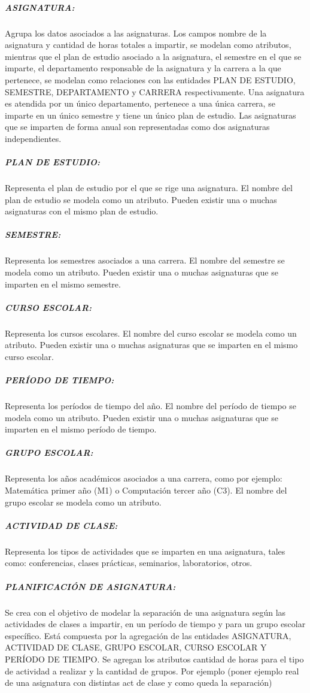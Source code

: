 \subparagraph{ASIGNATURA:}
Agrupa los datos asociados a las asignaturas.
Los campos nombre de la asignatura y cantidad de horas 
totales a impartir, se modelan como atributos, mientras que
el plan de estudio asociado a la asignatura, el semestre en el que se 
imparte, el departamento responsable de la asignatura y la carrera a la 
que pertenece, se modelan como relaciones con las entidades
PLAN DE ESTUDIO, SEMESTRE, DEPARTAMENTO y CARRERA respectivamente. Una asignatura 
es atendida por un único departamento, pertenece a una única carrera, se imparte en un 
único semestre y tiene un único plan de estudio. Las asignaturas que se imparten de forma 
anual son representadas como dos asignaturas independientes.

\subparagraph{PLAN DE ESTUDIO:}
Representa el plan de estudio por el que se rige una asignatura.
El nombre del plan de estudio se modela como un atributo.
Pueden existir una o muchas asignaturas con el mismo plan de estudio.



\subparagraph{SEMESTRE:}
Representa los semestres asociados a una carrera. 
El nombre del semestre se modela como un atributo.
Pueden existir una o muchas asignaturas que se imparten en 
el mismo semestre. 

\subparagraph{CURSO ESCOLAR:}
Representa los cursos escolares.
El nombre del curso escolar se modela como un atributo.
Pueden existir una o muchas asignaturas que se imparten en 
el mismo curso escolar.


\subparagraph{PERÍODO DE TIEMPO:}
Representa los períodos de tiempo del año.
El nombre del período de tiempo se modela como un atributo.
Pueden existir una o muchas asignaturas que se imparten en 
el mismo período de tiempo.


\subparagraph{GRUPO ESCOLAR:}
Representa los años académicos asociados a una carrera, como por ejemplo:
Matemática primer año (M1) o Computación tercer año (C3).
El nombre del grupo escolar se modela como un atributo.

\subparagraph{ACTIVIDAD DE CLASE:}
Representa los tipos de actividades que se imparten en una asignatura, 
tales como: conferencias, clases prácticas, seminarios, laboratorios, otros. 

\subparagraph{PLANIFICACIÓN DE ASIGNATURA:}
Se crea con el objetivo de modelar la separación de una asignatura
según las actividades de clases a impartir, en un período de tiempo y para
un grupo escolar específico. Está compuesta por la agregación de las entidades ASIGNATURA, ACTIVIDAD DE CLASE, GRUPO 
ESCOLAR, CURSO ESCOLAR Y PERÍODO DE TIEMPO.
Se agregan los atributos cantidad de horas para el tipo de actividad a realizar y 
la cantidad de grupos.
Por ejemplo (poner ejemplo real de una asignatura
con distintas act de clase y como queda la separación)



